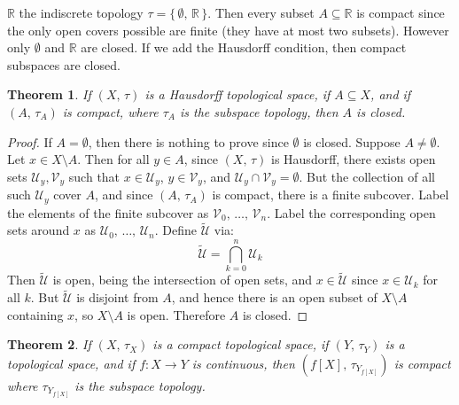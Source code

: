 \documentclass{article}
\theoremstyle{plain}
\newtheorem{theorem}{Theorem}[section]
\theoremstyle{normal}
\begin{document}
        $\mathbb{R}$ the indiscrete topology
        $\tau=\{\,\emptyset,\,\mathbb{R}\,\}$. Then every subset
        $A\subseteq\mathbb{R}$ is compact since the only open covers possible
        are finite (they have at most two subsets). However only
        $\emptyset$ and $\mathbb{R}$ are closed. If we add the Hausdorff
        condition, then compact subspaces are closed.
        \begin{theorem}
            If $(X,\,\tau)$ is a Hausdorff topological space, if
            $A\subseteq{X}$, and if $(A,\,\tau_{A})$ is compact, where
            $\tau_{A}$ is the subspace topology, then $A$ is closed. 
        \end{theorem}
        \begin{proof}
            If $A=\emptyset$, then there is nothing to prove since $\emptyset$
            is closed. Suppose $A\ne\emptyset$. Let $x\in{X}\setminus{A}$.
            Then for all $y\in{A}$, since $(X,\,\tau)$ is Hausdorff, there
            exists open sets $\mathcal{U}_{y},\mathcal{V}_{y}$ such that
            $x\in\mathcal{U}_{y}$, $y\in\mathcal{V}_{y}$, and
            $\mathcal{U}_{y}\cap\mathcal{V}_{y}=\emptyset$. But the collection
            of all such $\mathcal{U}_{y}$ cover $A$, and since
            $(A,\,\tau_{A})$ is compact, there is a finite subcover. Label the
            elements of the finite subcover as
            $\mathcal{V}_{0},\,\dots,\,\mathcal{V}_{n}$. Label the corresponding
            open sets around $x$ as $\mathcal{U}_{0},\,\dots,\,\mathcal{U}_{n}$.
            Define $\tilde{\mathcal{U}}$ via:
            \begin{equation}
                \tilde{\mathcal{U}}=\bigcap_{k=0}^{n}\mathcal{U}_{k}
            \end{equation}
            Then $\tilde{\mathcal{U}}$ is open, being the intersection of open
            sets, and $x\in\tilde{\mathcal{U}}$ since $x\in\mathcal{U}_{k}$
            for all $k$. But $\tilde{\mathcal{U}}$ is disjoint from
            $A$, and hence there is an open subset of $X\setminus{A}$ containing
            $x$, so $X\setminus{A}$ is open. Therefore $A$ is closed.
        \end{proof}
        \begin{theorem}
            If $(X,\,\tau_{X})$ is a compact topological space, if
            $(Y,\,\tau_{Y})$ is a topological space, and if
            $f:X\rightarrow{Y}$ is continuous, then
            $(f[X],\,\tau_{Y_{f[X]}})$ is compact where
            $\tau_{Y_{f[X]}}$ is the subspace topology.
        \end{theorem}
\end{document}
